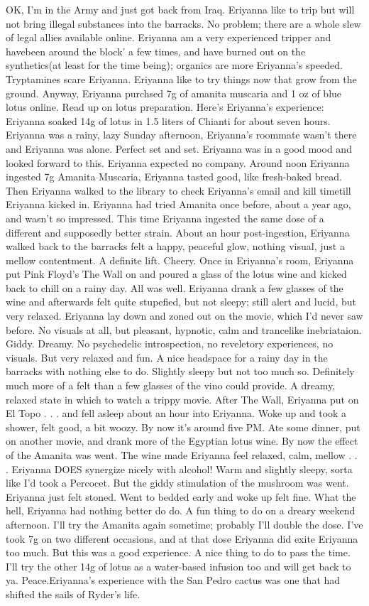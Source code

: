 \documentclass[12pt]{book}
\begin{document}
OK, I'm in the Army and just got back from Iraq. Eriyanna like to trip but will not bring illegal substances into the barracks. No problem; there are a whole slew of legal allies available online. Eriyanna am a very experienced tripper and havebeen around the block' a few times, and have burned out on the synthetics(at least for the time being); organics are more Eriyanna's speeded. Tryptamines scare Eriyanna. Eriyanna like to try things now that grow from the ground. Anyway, Eriyanna purchsed 7g of amanita muscaria and 1 oz of blue lotus online. Read up on lotus preparation. Here's Eriyanna's experience: Eriyanna soaked 14g of lotus in 1.5 liters of Chianti for about seven hours. Eriyanna was a rainy, lazy Sunday afternoon, Eriyanna's roommate wasn't there and Eriyanna was alone. Perfect set and set. Eriyanna was in a good mood and looked forward to this. Eriyanna expected no company. Around noon Eriyanna ingested 7g Amanita Muscaria, Eriyanna tasted good, like fresh-baked bread. Then Eriyanna walked to the library to check Eriyanna's email and kill timetill Eriyanna kicked in. Eriyanna had tried Amanita once before, about a year ago, and wasn't so impressed. This time Eriyanna ingested the same dose of a different and supposedly better strain. About an hour post-ingestion, Eriyanna walked back to the barracks felt a happy, peaceful glow, nothing visual, just a mellow contentment. A definite lift. Cheery. Once in Eriyanna's room, Eriyanna put Pink Floyd's The Wall on and poured a glass of the lotus wine and kicked back to chill on a rainy day. All was well. Eriyanna drank a few glasses of the wine and afterwards felt quite stupefied, but not sleepy; still alert and lucid, but very relaxed. Eriyanna lay down and zoned out on the movie, which I'd never saw before. No visuals at all, but pleasant, hypnotic, calm and trancelike inebriataion. Giddy. Dreamy. No psychedelic introspection, no reveletory experiences, no visuals. But very relaxed and fun. A nice headspace for a rainy day in the barracks with nothing else to do. Slightly sleepy but not too much so. Definitely much more of a felt than a few glasses of the vino could provide. A dreamy, relaxed state in which to watch a trippy movie. After The Wall, Eriyanna put on El Topo . . .  and fell asleep about an hour into Eriyanna. Woke up and took a shower, felt good, a bit woozy. By now it's around five PM. Ate some dinner, put on another movie, and drank more of the Egyptian lotus wine. By now the effect of the Amanita was went. The wine made Eriyanna feel relaxed, calm, mellow . . .  Eriyanna DOES synergize nicely with alcohol! Warm and slightly sleepy, sorta like I'd took a Percocet. But the giddy stimulation of the mushroom was went. Eriyanna just felt stoned. Went to bedded early and woke up felt fine. What the hell, Eriyanna had nothing better do do. A fun thing to do on a dreary weekend afternoon. I'll try the Amanita again sometime; probably I'll double the dose. I've took 7g on two different occasions, and at that dose Eriyanna did exite Eriyanna too much. But this was a good experience. A nice thing to do to pass the time. I'll try the other 14g of lotus as a water-based infusion too and will get back to ya. Peace.Eriyanna's experience with the San Pedro cactus was one that had shifted the sails of Ryder's life. 
\end{document}
